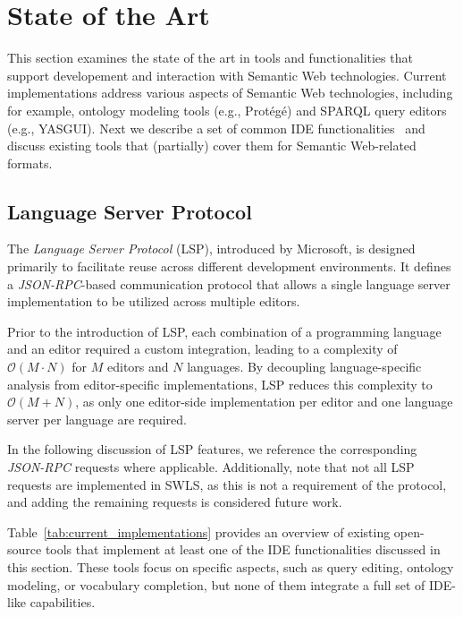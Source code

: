 
\section{State of the Art}%
\label{sec:related_work}

This section examines the state of the art in tools and functionalities that support developement and interaction with Semantic Web technologies. 
Current implementations address various aspects of Semantic Web technologies, including for example, ontology modeling tools (e.g., Protégé) and SPARQL query editors (e.g., YASGUI).
Next we describe a set of common IDE functionalities~\cite{HowAreJava} and discuss existing tools that (partially) cover them for Semantic Web-related formats.


\subsection{Language Server Protocol}

The \textit{Language Server Protocol} (LSP), introduced by Microsoft, is designed primarily to facilitate reuse across different development environments.
It defines a \textit{JSON-RPC}-based communication protocol that allows a single language server implementation to be utilized across multiple editors.

Prior to the introduction of LSP, each combination of a programming language and an editor required a custom integration, leading to a complexity of \(\mathcal{O}(M \cdot N)\) for \(M\) editors and \(N\) languages\cite{Kj_r_Rask_2021}.
By decoupling language-specific analysis from editor-specific implementations, LSP reduces this complexity to \(\mathcal{O}(M + N)\), as only one editor-side implementation per editor and one language server per language are required.

In the following discussion of LSP features, we reference the corresponding \textit{JSON-RPC} requests where applicable.
Additionally, note that not all LSP requests are implemented in SWLS, as this is not a requirement of the protocol, and adding the remaining requests is considered future work.

Table~\ref{tab:current_implementations} provides an overview of existing open-source tools that implement at least one of the IDE functionalities discussed in this section.
These tools focus on specific aspects, such as query editing, ontology modeling, or vocabulary completion, but none of them integrate a full set of IDE-like capabilities.

